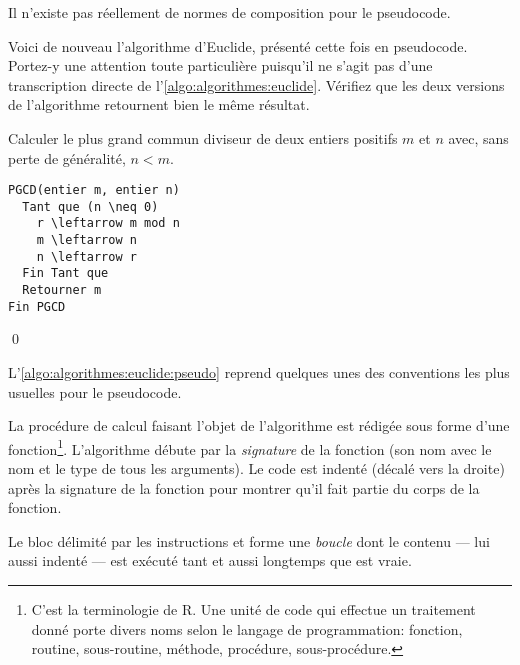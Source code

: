 Il n'existe pas réellement de normes de composition pour le
pseudocode.

Voici de nouveau l'algorithme d'Euclide, présenté cette fois en
pseudocode. Portez-y une attention toute particulière puisqu'il ne
s'agit pas d'une transcription directe de
l'\autoref{algo:algorithmes:euclide}. Vérifiez que les deux versions
de l'algorithme retournent bien le même résultat.

\begingroup
\renewcommand{\thealgorithme}{\ref*{algo:algorithmes:euclide}a}
\begin{algorithme}
  \label{algo:algorithmes:euclide:pseudo}
  Calculer le plus grand commun diviseur de deux entiers positifs $m$
  et $n$ avec, sans perte de généralité, $n < m$.
\begin{Schunk}
\begin{Verbatim}[commandchars=\\\{\}]
PGCD(entier m, entier n)
  Tant que (n \neq 0)
    r \leftarrow m mod n
    m \leftarrow n
    n \leftarrow r
  Fin Tant que
  Retourner m
Fin PGCD
\end{Verbatim}
\end{Schunk}
  \qed
\end{algorithme}
\endgroup


L'\autoref{algo:algorithmes:euclide:pseudo} reprend quelques unes des
conventions les plus usuelles pour le pseudocode.

La procédure de calcul faisant l'objet de l'algorithme est rédigée
sous forme d'une fonction\footnote{%
  C'est la terminologie de R. Une unité de code qui effectue un
  traitement donné porte divers noms selon le langage de
  programmation: fonction, routine, sous-routine, méthode, procédure,
  sous-procédure.}. %
L'algorithme débute par la \emph{signature} de la
fonction (son nom avec le nom et le type de tous les arguments). Le
code est indenté (décalé vers la droite) après la signature de la
fonction pour montrer qu'il fait partie du corps de la fonction.

Le bloc délimité par les instructions  et  forme une
\emph{boucle} dont le contenu --- lui aussi indenté ---
est exécuté tant et aussi longtemps que  est vraie.

